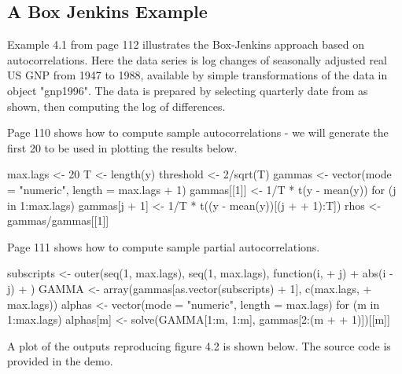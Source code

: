 \documentclass[a4paper]{article}
\begin{document}
\subsection{A Box Jenkins Example}
Example 4.1 from page 112 illustrates the Box-Jenkins
approach based on autocorrelations.  Here the data series is log changes
of seasonally adjusted real US GNP from 1947 to 1988,
available by simple transformations of the data in object "gnp1996".
The data is prepared by selecting quarterly date from as shown, then computing the log of differences.
\begin{Schunk}
\end{Schunk}
Page 110 shows how to compute sample autocorrelations - we will generate the first 20 to be used in plotting the results below.
\begin{Schunk}
\begin{Sinput}
 max.lags <- 20
 T <- length(y)
 threshold <- 2/sqrt(T)
 gammas <- vector(mode = "numeric", length = max.lags + 1)
 gammas[[1]] <- 1/T * t(y - mean(y)) %
 for (j in 1:max.lags) gammas[j + 1] <- 1/T * t((y - mean(y))[(j + 
+     1):T]) %
 rhos <- gammas/gammas[[1]]
\end{Sinput}
\end{Schunk}
Page 111 shows how to compute sample partial autocorrelations.  
\begin{Schunk}
\begin{Sinput}
 subscripts <- outer(seq(1, max.lags), seq(1, max.lags), function(i, 
+     j) {
+     abs(i - j)
+ })
 GAMMA <- array(gammas[as.vector(subscripts) + 1], c(max.lags, 
+     max.lags))
 alphas <- vector(mode = "numeric", length = max.lags)
 for (m in 1:max.lags) alphas[m] <- solve(GAMMA[1:m, 1:m], gammas[2:(m + 
+     1)])[[m]]
\end{Sinput}
\end{Schunk}
A plot of the outputs reproducing figure 4.2 is shown below.  The source code is provided in the demo.
\end{document}
